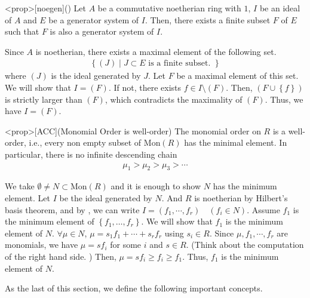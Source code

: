 \documentclass{article}
\renewcommand{\mid}{\middle|}
\begin{document}
\begin{statementsp}<prop>[noegen]()
    Let $A$ be a commutative noetherian ring with $1$, $I$ be an ideal of $A$ and $E$ be a generator system of $I$. Then, there exists a finite subset $F$ of $E$ such that $F$ is also a generator system of $I$.
\end{statementsp}
\begin{pfsp}
    Since $A$ is noetherian, there exists a maximal element of the following set. 
    \begin{align}
        \left\{ (J) \mid J \subset E \text{ is a finite subset. } \right\}
    \end{align}
    where $(J)$ is the ideal generated by $J$. Let $F$ be a maximal element of this set. We will show that $I = (F)$. If not, there exists $f \in I \setminus (F)$. Then, $(F \cup \left\{ f \right\})$ is strictly larger than $(F)$, which contradicts the maximality of $(F)$. Thus, we have $I = (F)$.
\end{pfsp}

\begin{statementsp}<prop>[ACC](Monomial Order is well-order)
    The monomial order on $R$ is a well-order, i.e., every non empty subset of $\mathrm{Mon}(R)$ has the minimal element. In particular, there is no infinite descending chain
    \begin{align}
        \mu_1 > \mu_2 > \mu_3 > \cdots
    \end{align}
\end{statementsp}
\begin{pfsp}
    We take $\emptyset \neq N \subset \mathrm{Mon}(R)$ and it is enough to show $N$ has the minimum element. Let $I$ be the ideal generated by $N$. And $R$ is noetherian by Hilbert's basis theorem, and by , we can write $I = (f_1, \cdots, f_r) \quad (f_i \in N)$. Assume $f_1$ is the minimum element of $\left\{ f_1, \ldots, f_r \right\}$. We will show that $f_1$ is the minimum element of $N$. $\forall \mu \in N$, $\mu = s_1 f_1 + \cdots + s_r f_r$ using $s_i \in R$. Since $\mu, f_1, \cdots, f_r$ are monomials, we have $\mu = s f_i$ for some $i$ and $s \in R$. (Think about the computation of the right hand side. ) Then, $\mu = s f_i \geq f_i \geq f_1$. Thus, $f_1$ is the minimum element of $N$.
\end{pfsp}

As the last of this section, we define the following important concepts.
\end{document}
